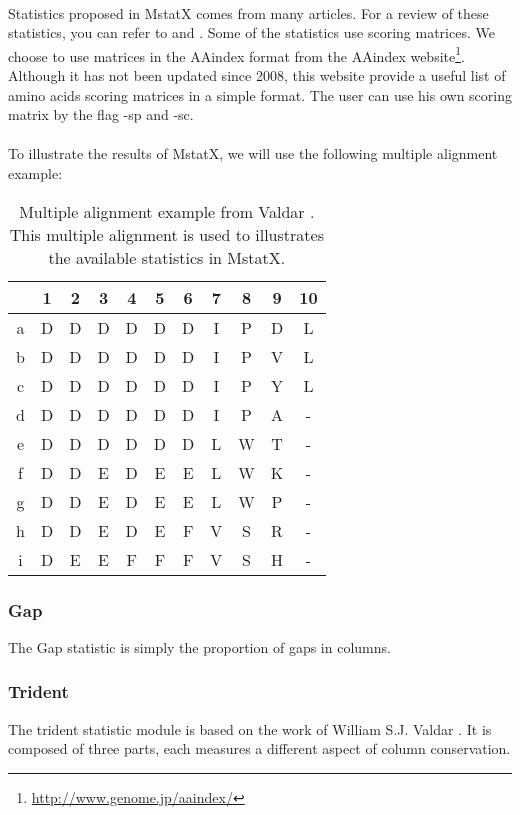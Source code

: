 \documentclass[12pt]{report}
\begin{document}
\paragraph{}
Statistics proposed in MstatX comes from many articles. For a review of these statistics, you can refer to  \cite{Valdar-2002} and  \cite{Johansson-2010}. Some of the statistics use scoring matrices. We choose to use matrices in the AAindex format \cite{Kawashima-2008} from the AAindex website\footnote{\url{http://www.genome.jp/aaindex/}}. Although it has not been updated since 2008, this website provide a useful list of amino acids scoring matrices in a simple format. The user can use his own scoring matrix by the flag -sp and -sc.

\paragraph{}
To illustrate the results of MstatX, we will use the following multiple alignment example:
\begin{table}
\begin{center}
\begin{tabular}{c|cccccccccc}
  &1&2&3&4&5&6&7&8&9&10\\
  \hline
a&D&D&D&D&D&D&I&P&D&L\\
b&D&D&D&D&D&D&I&P&V&L\\
c&D&D&D&D&D&D&I&P&Y&L\\
d&D&D&D&D&D&D&I&P&A&-\\
e&D&D&D&D&D&D&L&W&T&-\\
f&D&D&E&D&E&E&L&W&K&-\\
g&D&D&E&D&E&E&L&W&P&-\\
h&D&D&E&D&E&F&V&S&R&-\\
i&D&E&E&F&F&F&V&S&H&-
\end{tabular}
\end{center}
\caption{Multiple alignment example from Valdar \cite{Valdar-2002}. This multiple alignment is used to illustrates the available statistics in MstatX.}
\end{table}

\subsubsection{Gap}
\label{gap_stat}
The Gap statistic is simply the proportion of gaps in columns. 

\subsubsection{Trident}
\label{trid_stat}
The trident statistic module is based on the work of William S.J. Valdar \cite{Valdar-2002}. 
It is composed of three parts, each measures a different aspect of column conservation.\\
\end{document}
